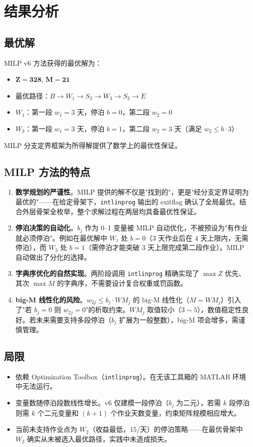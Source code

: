 \documentclass[12pt,a4paper]{ctexart}
\theoremstyle{definition}
\begin{document}
\section{结果分析}

\subsection{最优解}

MILP v6 方法获得的最优解为：
\begin{itemize}
  \item $\mathbf{Z=328}$, $\mathbf{M=21}$
  \item 最优路径：$B\to W_1\to S_2\to W_3\to S_2\to E$
  \item $W_1$：第一段 $w_1=3$ 天，停泊 $b=0$，第二段 $w_2=0$
  \item $W_3$：第一段 $w_1=3$ 天，停泊 $b=1$，第二段 $w_2=3$ 天（满足 $w_2\le b\cdot 3$）
\end{itemize}

MILP 分支定界框架为所得解提供了数学上的最优性保证。

\subsection{MILP 方法的特点}

\begin{enumerate}
  \item \textbf{数学规划的严谨性}。MILP 提供的解不仅是"找到的"，更是"经分支定界证明为最优的"——在给定骨架下，\texttt{intlinprog} 输出的 exitflag 确认了全局最优。结合外层骨架全枚举，整个求解过程在两层均具备最优性保证。

  \item \textbf{停泊决策的自动化}。$b_j$ 作为 0--1 变量被 MILP 自动优化，不被预设为"有作业就必须停泊"。例如在最优解中 $W_1$ 处 $b=0$（3 天作业后在 $4$ 天上限内，无需停泊），而 $W_3$ 处 $b=1$（需停泊才能突破 $3$ 天上限完成第二段作业）。MILP 自动做出了分化的选择。

  \item \textbf{字典序优化的自然实现}。两阶段调用 \texttt{intlinprog} 精确实现了 $\max Z$ 优先、其次 $\max M$ 的字典序，不需要设计复合权重或罚函数。

  \item \textbf{big-M 线性化的风险}。$w_{2j}\le b_j\cdot WM_j$ 的 big-M 线性化（$M=WM_j$）引入了"若 $b_j=0$ 则 $w_{2j}=0$"的析取约束。$WM_j$ 取值较小（$3\sim 5$），数值稳定性良好。若未来需要支持多段停泊（$b_j$ 扩展为一般整数），big-M 项会增多，需谨慎管理。
\end{enumerate}

\subsection{局限}

\begin{itemize}
  \item 依赖 Optimization Toolbox（\texttt{intlinprog}）。在无该工具箱的 MATLAB 环境中无法运行。
  \item 变量数随停泊段数线性增长。v6 仅建模一段停泊（$b_j$ 为二元），若需 $k$ 段停泊则需 $k$ 个二元变量和 $(k+1)$ 个作业天数变量，约束矩阵规模相应增大。
  \item 当前未支持作业点为 $W_2$（收益最低，$15$/天）的停泊策略——在最优骨架中 $W_2$ 确实从未被选入最优路径，实践中未造成损失。
\end{itemize}
\end{document}
